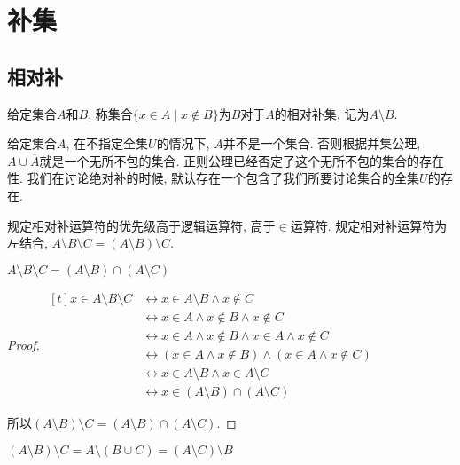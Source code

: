 \section{补集}
\subsection{相对补}
\begin{definition}
	给定集合$A$和$B$, 称集合$\{x\in A\mid x\notin B\}$为$B$对于$A$的相对补集, 记为$A\setminus B$.
\end{definition}

给定集合$A$, 在不指定全集$U$的情况下, $\overline A$并不是一个集合. 否则根据并集公理, $A\cup \overline A$就是一个无所不包的集合. 正则公理已经否定了这个无所不包的集合的存在性. 我们在讨论绝对补的时候, 默认存在一个包含了我们所要讨论集合的全集$U$的存在.

规定相对补运算符的优先级高于逻辑运算符, 高于$\in$运算符. 规定相对补运算符为左结合, $A\setminus B\setminus C=(A\setminus B)\setminus C$.

\begin{proposition}
	$A\setminus B\setminus C=(A\setminus B)\cap (A\setminus C)$
\end{proposition}

\begin{proof}
	$\begin{aligned}[t]
		x\in A\setminus B\setminus C & \leftrightarrow x\in A\setminus B\wedge x\notin C \\
		& \leftrightarrow x\in A\wedge x\notin B\wedge x\notin C \\
		& \leftrightarrow x\in A\wedge x\notin B\wedge x\in A\wedge x\notin C \\
		& \leftrightarrow (x\in A\wedge x\notin B)\wedge (x\in A\wedge x\notin C) \\
		& \leftrightarrow x\in A\setminus B\wedge x\in A\setminus C \\
		& \leftrightarrow x\in (A\setminus B)\cap (A\setminus C)
	\end{aligned}$
	
	所以$(A\setminus B)\setminus C=(A\setminus B)\cap (A\setminus C)$.
\end{proof}

\begin{proposition}
	$(A\setminus B)\setminus C=A\setminus (B\cup C)=(A\setminus C)\setminus B$
\end{proposition}

